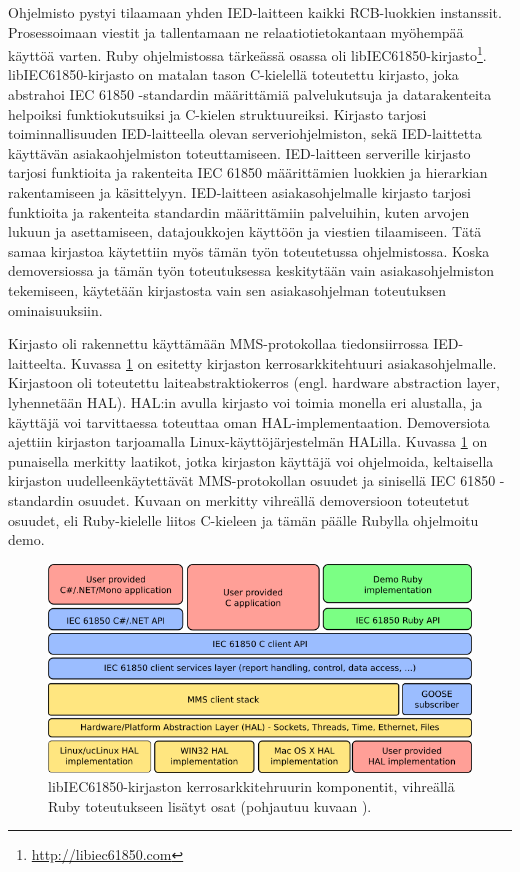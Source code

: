Ohjelmisto pystyi tilaamaan yhden IED-laitteen kaikki RCB-luokkien instanssit. Prosessoimaan viestit ja tallentamaan ne relaatiotietokantaan myöhempää käyttöä varten. Ruby ohjelmistossa tärkeässä osassa oli libIEC61850-kirjasto\footnote{\url{http://libiec61850.com}}. libIEC61850-kirjasto on matalan tason C-kielellä toteutettu kirjasto, joka abstrahoi IEC 61850 -standardin määrittämiä palvelukutsuja ja datarakenteita helpoiksi funktiokutsuiksi ja C-kielen struktuureiksi. Kirjasto tarjosi toiminnallisuuden IED-laitteella olevan serveriohjelmiston, sekä IED-laittetta käyttävän asiakaohjelmiston toteuttamiseen. IED-laitteen serverille kirjasto tarjosi funktioita ja rakenteita IEC 61850 määrittämien luokkien ja hierarkian rakentamiseen ja käsittelyyn. IED-laitteen asiakasohjelmalle kirjasto tarjosi funktioita ja rakenteita standardin määrittämiin palveluihin, kuten arvojen lukuun ja asettamiseen, datajoukkojen käyttöön ja viestien tilaamiseen. Tätä samaa kirjastoa käytettiin myös tämän työn toteutetussa ohjelmistossa. Koska demoversiossa ja tämän työn toteutuksessa keskitytään vain asiakasohjelmiston tekemiseen, käytetään kirjastosta vain sen asiakasohjelman toteutuksen ominaisuuksiin.

Kirjasto oli rakennettu käyttämään MMS-protokollaa tiedonsiirrossa IED-laitteelta. Kuvassa \ref{fig:libiec61850-layer-architecture} on esitetty kirjaston kerrosarkkitehtuuri asiakasohjelmalle. Kirjastoon oli toteutettu laiteabstraktiokerros (engl. hardware abstraction layer, lyhennetään HAL). HAL:in avulla kirjasto voi toimia monella eri alustalla, ja käyttäjä voi tarvittaessa toteuttaa oman HAL-implementaation. Demoversiota ajettiin kirjaston tarjoamalla Linux-käyttöjärjestelmän HALilla. Kuvassa \ref{fig:libiec61850-layer-architecture} on punaisella merkitty laatikot, jotka kirjaston käyttäjä voi ohjelmoida, keltaisella kirjaston uudelleenkäytettävät MMS-protokollan osuudet ja sinisellä IEC 61850 -standardin osuudet. Kuvaan on merkitty vihreällä demoversioon toteutetut osuudet, eli Ruby-kielelle liitos C-kieleen ja tämän päälle Rubylla ohjelmoitu demo.

\begin{figure}
	\includegraphics[width=1\textwidth]{pictures/libiec61850-layer-architecture.png}
	\caption{libIEC61850-kirjaston kerrosarkkitehruurin komponentit, vihreällä Ruby toteutukseen lisätyt osat (pohjautuu kuvaan \cite{libIEC61850-api-overview}).}
	\label{fig:libiec61850-layer-architecture}
\end{figure}

